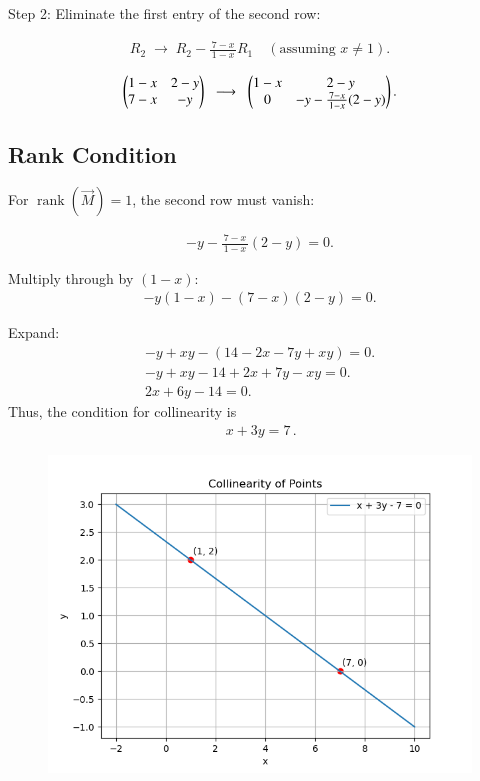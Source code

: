 \documentclass[journal]{IEEEtran}
\begin{document}
Step 2: Eliminate the first entry of the second row:

\begin{align}
R_2 \;\longrightarrow\; R_2 - \frac{7-x}{\,1-x\,}R_1 \quad (\text{assuming } x\neq 1).
\end{align}

\begin{align}
\myvec
{1-x & 2-y \\
7-x & -y}
\;\;\longrightarrow\;\;
\myvec
{1-x & 2-y \\
0 & -y - \frac{7-x}{\,1-x\,}(2-y)}.
\end{align}

\subsection*{Rank Condition}

For $\operatorname{rank}(\vec{M})=1$, the second row must vanish:

\begin{align}
-y - \frac{7-x}{\,1-x\,}(2-y) = 0.
\end{align}

Multiply through by $(1-x)$:
\begin{align}
-y(1-x) - (7-x)(2-y) = 0.
\end{align}

Expand:
\begin{align}
- y + xy - (14 - 2x - 7y + xy) = 0.  \\
- y + xy - 14 + 2x + 7y - xy = 0.  \\
2x + 6y - 14 = 0.
\end{align}
Thus, the condition for collinearity is
\begin{align}
\boxed{\,x + 3y = 7\,}.
\end{align}

\begin{figure}[h]
\centering
\includegraphics[width=0.7\columnwidth]{figs/fig1.png}
\caption{}
\label{}
\end{figure}
\end{document}
